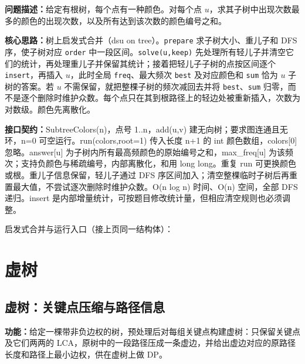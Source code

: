 \noindent\textbf{问题描述：}\allowbreak 给定有根树，每个点有一种颜色。对每个点 $u$，求其子树中出现次数最多的颜色的出现次数，以及所有达到该次数的颜色编号之和。

\textbf{核心思路：}\allowbreak 树上启发式合并（dsu on tree）。\texttt{prepare} 求子树大小、重儿子和 DFS 序，使子树对应 \texttt{order} 中一段区间。\texttt{solve(u,keep)} 先处理所有轻儿子并清空它们的统计，再处理重儿子并保留其统计；接着把轻儿子子树的点按区间逐个 \texttt{insert}，再插入 $u$，此时全局 \texttt{freq}、最大频次 \texttt{best} 及对应颜色和 \texttt{sum} 恰为 $u$ 子树的答案。若 $u$ 不需保留，就把整棵子树的频次减回去并将 \texttt{best}、\texttt{sum} 归零，而不是逐个删除时维护众数。每个点只在其到根路径上的轻边处被重新插入，次数为对数级。颜色先离散化。



{\sloppy{}\noindent\textbf{接口契约：}SubtreeColors(n)，点号 1..n，add(u,v) 建无向树；要求图连通且无环，n=0 可空运行。run(colors,root=1) 传入长度 n+1 的 int 颜色数组，colors[0] 忽略。answer[u] 为子树内所有最高频颜色的原始编号之和，max\_freq[u] 为该频次；支持负颜色与稀疏编号，内部离散化，和用 long long。重复 run 可更换颜色或根。重儿子信息保留，轻儿子通过 DFS 序区间加入；清空整棵临时子树后再重置最大值，不尝试逐次删除时维护众数。O(n log n) 时间、O(n) 空间，全部 DFS 递归。insert 是内部增量统计，可按题目修改统计量，但相应清空规则也必须调整。\par}

\Needspace{638pt}



\newpage

\noindent 启发式合并与运行入口（接上页同一结构体）：



\Needspace{180pt}

\section{虚树}

\subsection{虚树：关键点压缩与路径信息}\label{compact-VirtualTree}

\noindent\textbf{功能：}\allowbreak 给定一棵带非负边权的树，预处理后对每组关键点构建虚树：只保留关键点及它们两两的 LCA，原树中的一段路径压成一条虚边，并给出虚边对应的原路径长度和路径上最小边权，供在虚树上做 DP。

